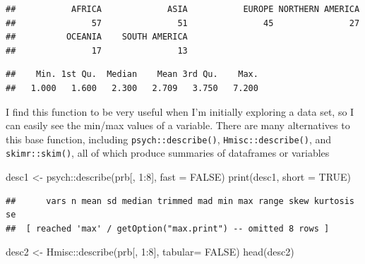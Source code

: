 \documentclass[
]{book}
\newenvironment{Shaded}{\begin{snugshade}}{\end{snugshade}}
\newcommand{\AttributeTok}[1]{\textcolor[rgb]{0.77,0.63,0.00}{#1}}
\newcommand{\ConstantTok}[1]{\textcolor[rgb]{0.00,0.00,0.00}{#1}}
\newcommand{\DecValTok}[1]{\textcolor[rgb]{0.00,0.00,0.81}{#1}}
\newcommand{\FunctionTok}[1]{\textcolor[rgb]{0.00,0.00,0.00}{#1}}
\newcommand{\NormalTok}[1]{#1}
\newcommand{\OtherTok}[1]{\textcolor[rgb]{0.56,0.35,0.01}{#1}}
\newcommand{\SpecialCharTok}[1]{\textcolor[rgb]{0.00,0.00,0.00}{#1}}
\begin{document}
\begin{verbatim}
##           AFRICA             ASIA           EUROPE NORTHERN AMERICA 
##               57               51               45               27 
##          OCEANIA    SOUTH AMERICA 
##               17               13
\end{verbatim}

\begin{Shaded}
\end{Shaded}

\begin{verbatim}
##    Min. 1st Qu.  Median    Mean 3rd Qu.    Max. 
##   1.000   1.600   2.300   2.709   3.750   7.200
\end{verbatim}

I find this function to be very useful when I'm initially exploring a
data set, so I can easily see the min/max values of a variable. There
are many alternatives to this base function, including
\texttt{psych::describe()}, \texttt{Hmisc::describe()}, and \texttt{skimr::skim()}, all of
which produce summaries of dataframes or variables

\begin{Shaded}
\begin{Highlighting}[]
\NormalTok{desc1  }\OtherTok{\textless{}{-}}\NormalTok{  psych}\SpecialCharTok{::}\FunctionTok{describe}\NormalTok{(prb[, }\DecValTok{1}\SpecialCharTok{:}\DecValTok{8}\NormalTok{],}
                           \AttributeTok{fast =} \ConstantTok{FALSE}\NormalTok{)}
\FunctionTok{print}\NormalTok{(desc1,}
      \AttributeTok{short =} \ConstantTok{TRUE}\NormalTok{)}
\end{Highlighting}
\end{Shaded}

\begin{verbatim}
##      vars n mean sd median trimmed mad min max range skew kurtosis se
##  [ reached 'max' / getOption("max.print") -- omitted 8 rows ]
\end{verbatim}

\begin{Shaded}
\begin{Highlighting}[]
\NormalTok{desc2 }\OtherTok{\textless{}{-}}\NormalTok{  Hmisc}\SpecialCharTok{::}\FunctionTok{describe}\NormalTok{(prb[, }\DecValTok{1}\SpecialCharTok{:}\DecValTok{8}\NormalTok{],}
                          \AttributeTok{tabular=} \ConstantTok{FALSE}\NormalTok{)}
\FunctionTok{head}\NormalTok{(desc2)}
\end{Highlighting}
\end{Shaded}
\end{document}
